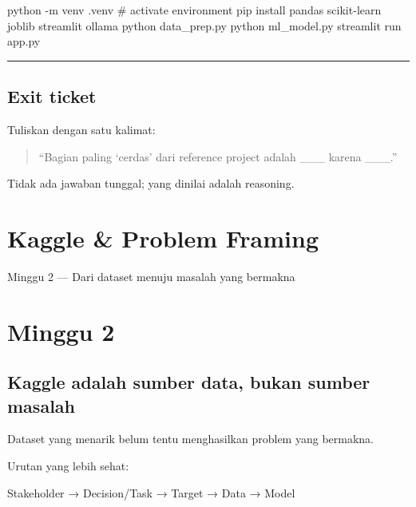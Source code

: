\documentclass[
  indonesian,
  letterpaper,
  DIV=11,
  numbers=noendperiod]{scrreprt}
\newenvironment{Shaded}{\begin{snugshade}}{\end{snugshade}}
\newcommand{\AttributeTok}[1]{\textcolor[rgb]{0.40,0.45,0.13}{#1}}
\newcommand{\CommentTok}[1]{\textcolor[rgb]{0.37,0.37,0.37}{#1}}
\newcommand{\ExtensionTok}[1]{\textcolor[rgb]{0.00,0.23,0.31}{#1}}
\newcommand{\NormalTok}[1]{\textcolor[rgb]{0.00,0.23,0.31}{#1}}
\begin{document}
\begin{Shaded}
\begin{Highlighting}[]
\ExtensionTok{python} \AttributeTok{{-}m}\NormalTok{ venv .venv}
\CommentTok{\# activate environment}
\ExtensionTok{pip}\NormalTok{ install pandas scikit{-}learn joblib streamlit ollama}
\ExtensionTok{python}\NormalTok{ data\_prep.py}
\ExtensionTok{python}\NormalTok{ ml\_model.py}
\ExtensionTok{streamlit}\NormalTok{ run app.py}
\end{Highlighting}
\end{Shaded}

\begin{center}\rule{0.5\linewidth}{0.5pt}\end{center}

\section{Exit ticket}\label{exit-ticket}

Tuliskan dengan satu kalimat:

\begin{quote}
``Bagian paling `cerdas' dari reference project adalah \_\_\_ karena
\_\_\_.''
\end{quote}

Tidak ada jawaban tunggal; yang dinilai adalah reasoning.

\chapter{Kaggle \& Problem Framing}\label{kaggle-problem-framing}

Minggu 2 --- Dari dataset menuju masalah yang bermakna

\hfill\break

\chapter{Minggu 2}\label{minggu-2}

\section{Kaggle adalah sumber data, bukan sumber
masalah}\label{kaggle-adalah-sumber-data-bukan-sumber-masalah}

Dataset yang menarik belum tentu menghasilkan problem yang bermakna.

Urutan yang lebih sehat:

\begin{Shaded}
\begin{Highlighting}[]
\NormalTok{Stakeholder → Decision/Task → Target → Data → Model}
\end{Highlighting}
\end{Shaded}
\end{document}
